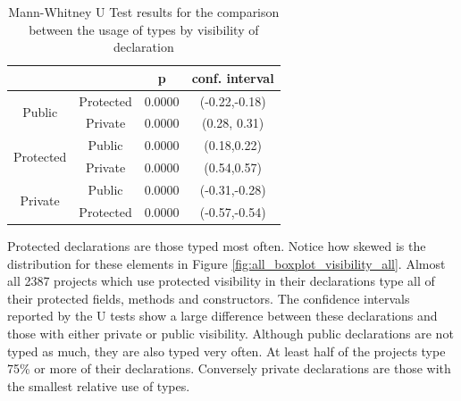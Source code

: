 \documentclass[preprint]{sigplanconf}
\renewcommand{\arraystretch}{1.2}
\begin{document}
\begin{table}[h]

\centering{}%
\renewcommand{\arraystretch}{1.2}

\begin{tabular}{|c|c|c|c|}
\hline 
								& {}		& p		& conf. interval	\\
\hline
\hline
\multirow{2}{*}{Public}			& Protected	& 0.0000 & (-0.22,-0.18)	\\ 
								& Private	& 0.0000 &  (0.28, 0.31)	\\
\hline  
\multirow{2}{*}{Protected}		& Public	& 0.0000 & (0.18,0.22)	\\
								& Private	& 0.0000 & (0.54,0.57)	\\
\hline  
\multirow{2}{*}{Private}		& Public	& 0.0000 & (-0.31,-0.28)	\\
								& Protected	& 0.0000 & (-0.57,-0.54)	\\
\hline  
\end{tabular}
\label{tab:all_utest_visibility}
\caption{Mann-Whitney U Test results for the comparison between the usage of types by visibility of declaration}
\end{table}

Protected declarations are those typed most often.
Notice how skewed is the distribution for these elements in Figure \ref{fig:all_boxplot_visibility_all}.
Almost all 2387 projects which use protected visibility in their declarations type all of their protected fields, methods and constructors.
The confidence intervals reported by the U tests show a large difference between these declarations and those with either private or public visibility.
Although public declarations are not typed as much, they are also typed very often.
At least half of the projects type 75\% or more of their declarations.
Conversely private declarations are those with the smallest relative use of types.
\end{document}
